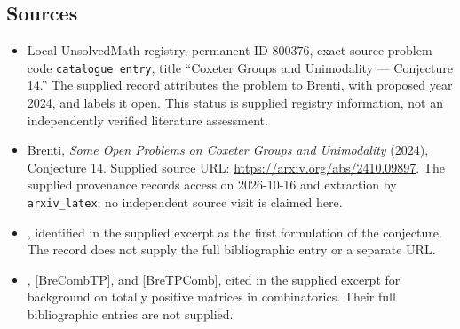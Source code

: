 \documentclass[11pt]{article}
\begin{document}
\subsection{Sources}
\begin{itemize}
\item Local UnsolvedMath registry, permanent ID \(800376\), exact source problem code \texttt{catalogue entry}, title ``Coxeter Groups and Unimodality --- Conjecture 14.'' The supplied record attributes the problem to Brenti, with proposed year 2024, and labels it open. This status is supplied registry information, not an independently verified literature assessment.
\item Brenti, \emph{Some Open Problems on Coxeter Groups and Unimodality} (2024), Conjecture 14. Supplied source URL: \url{https://arxiv.org/abs/2410.09897}. The supplied provenance records access on 2026-10-16 and extraction by \texttt{arxiv\_latex}; no independent source visit is claimed here.
\item [BreCombTP, Conjecture 6.10], identified in the supplied excerpt as the first formulation of the conjecture. The record does not supply the full bibliographic entry or a separate URL.
\item [BreMem], [BreCombTP], and [BreTPComb], cited in the supplied excerpt for background on totally positive matrices in combinatorics. Their full bibliographic entries are not supplied.
\end{itemize}
\end{document}
